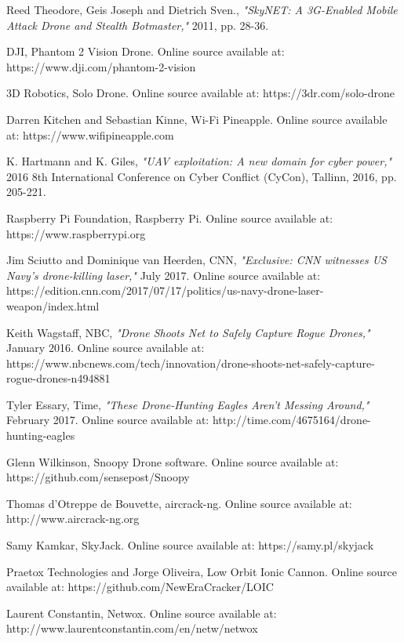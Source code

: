 \documentclass[journal]{IEEEtran}
\begin{document}
\begin{thebibliography}{1}
Reed Theodore, Geis Joseph and Dietrich Sven., \textit{"SkyNET: A 3G-Enabled Mobile Attack Drone and Stealth Botmaster,"} 2011, pp. 28-36.

DJI, Phantom 2 Vision Drone. Online source available at: https://www.dji.com/phantom-2-vision

3D Robotics, Solo Drone. Online source available at: https://3dr.com/solo-drone

Darren Kitchen and Sebastian Kinne, Wi-Fi Pineapple. Online source available at: https://www.wifipineapple.com

K. Hartmann and K. Giles, \textit{"UAV exploitation: A new domain for cyber power,"} 2016 8th International Conference on Cyber Conflict (CyCon), Tallinn, 2016, pp. 205-221.

Raspberry Pi Foundation, Raspberry Pi. Online source available at: https://www.raspberrypi.org

Jim Sciutto and Dominique van Heerden, CNN, \textit{"Exclusive: CNN witnesses US Navy's drone-killing laser,"} July 2017. Online source available at: https://edition.cnn.com/2017/07/17/politics/us-navy-drone-laser-weapon/index.html

Keith Wagstaff, NBC, \textit{"Drone Shoots Net to Safely Capture Rogue Drones,"} January 2016. Online source available at: https://www.nbcnews.com/tech/innovation/drone-shoots-net-safely-capture-rogue-drones-n494881

Tyler Essary, Time, \textit{"These Drone-Hunting Eagles Aren't Messing Around,"} February 2017. Online source available at: http://time.com/4675164/drone-hunting-eagles

Glenn Wilkinson, Snoopy Drone software. Online source available at: https://github.com/sensepost/Snoopy

Thomas d'Otreppe de Bouvette, aircrack-ng. Online source available at: http://www.aircrack-ng.org

Samy Kamkar, SkyJack. Online source available at: https://samy.pl/skyjack

Praetox Technologies and Jorge Oliveira, Low Orbit Ionic Cannon. Online source available at: https://github.com/NewEraCracker/LOIC

Laurent Constantin, Netwox. Online source available at: http://www.laurentconstantin.com/en/netw/netwox


\end{thebibliography}
\end{document}
